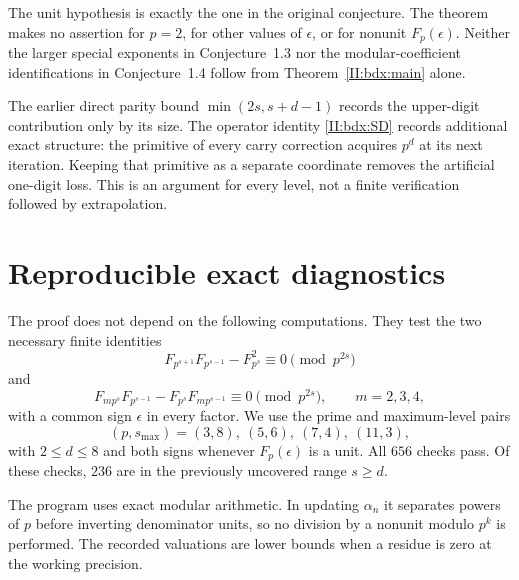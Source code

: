 \documentclass[11pt,letterpaper]{article}
\theoremstyle{definition}
\theoremstyle{remark}
\newcommand{\paperanchors}[1]{%
 \renewcommand{\theHsection}{#1.\arabic{section}}%
 \renewcommand{\theHsubsection}{\theHsection.\arabic{subsection}}%
 \renewcommand{\theHequation}{#1.\arabic{equation}}%
 \renewcommand{\theHtable}{#1.\arabic{table}}%
 \renewcommand{\theHtheorem}{\theHsection.\arabic{theorem}}}
\begin{document}
The unit hypothesis is exactly the one in the original conjecture.
The theorem makes no assertion for $p=2$, for other values of
$\epsilon$, or for nonunit $F_p(\epsilon)$.
Neither the larger special exponents in Conjecture~1.3 nor the
modular-coefficient identifications in Conjecture~1.4 follow from
Theorem~\ref{II:bdx:main} alone.

The earlier direct parity bound
$\min(2s,s+d-1)$ records the upper-digit contribution only by its size.
The operator identity \eqref{II:bdx:SD} records additional exact structure:
the primitive of every carry correction acquires $p^d$ at its next
iteration. Keeping that primitive as a separate coordinate removes
the artificial one-digit loss. This is an argument for every level,
not a finite verification followed by extrapolation.

\appendix\paperanchors{II.app}
\section{Reproducible exact diagnostics}

The proof does not depend on the following computations. They test
the two necessary finite identities
\[
 F_{p^{s+1}}F_{p^{s-1}}-F_{p^s}^{2}\equiv0\pmod{p^{2s}}
\]
and
\[
 F_{mp^s}F_{p^{s-1}}-F_{p^s}F_{mp^{s-1}}
                          \equiv0\pmod{p^{2s}},
 \qquad m=2,3,4,
\]
with a common sign $\epsilon$ in every factor. We use the prime and
maximum-level pairs
\[
 (p,s_{\max})=(3,8),\ (5,6),\ (7,4),\ (11,3),
\]
with $2\le d\le8$ and both signs whenever $F_p(\epsilon)$ is a unit.
All $656$ checks pass.
Of these checks, $236$ are in the previously uncovered range $s\ge d$.

The program uses exact modular arithmetic. In updating $\alpha_n$ it
separates powers of $p$ before inverting denominator units, so no
division by a nonunit modulo $p^k$ is performed. The recorded valuations
are lower bounds when a residue is zero at the working precision.
\end{document}
